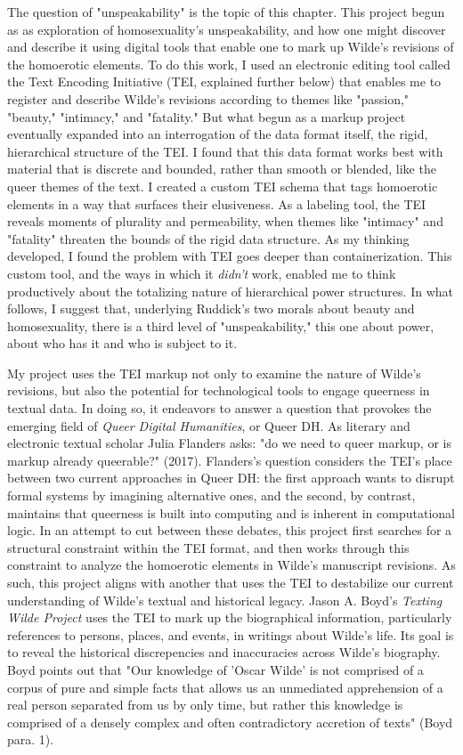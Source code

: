 \documentclass[11pt]{article}
\begin{document}
The question of "unspeakability" is the topic of this chapter. This
project begun as as exploration of homosexuality's unspeakability, and
how one might discover and describe it using digital tools that enable
one to mark up Wilde's revisions of the homoerotic elements. To do
this work, I used an electronic editing tool called the Text Encoding
Initiative (TEI, explained further below) that enables me to register
and describe Wilde's revisions according to themes like "passion,"
"beauty," "intimacy," and "fatality." But what begun as a markup
project eventually expanded into an interrogation of the data format
itself, the rigid, hierarchical structure of the TEI. I found that
this data format works best with material that is discrete and
bounded, rather than smooth or blended, like the queer themes of the
text. I created a custom TEI schema that tags homoerotic elements in a
way that surfaces their elusiveness. As a labeling tool, the TEI
reveals moments of plurality and permeability, when themes like
"intimacy" and "fatality" threaten the bounds of the rigid data
structure. As my thinking developed, I found the problem with TEI goes
deeper than containerization. This custom tool, and the ways in which
it \emph{didn't} work, enabled me to think productively about the
totalizing nature of hierarchical power structures. In what follows, I
suggest that, underlying Ruddick's two morals about beauty and
homosexuality, there is a third level of "unspeakability," this one
about power, about who has it and who is subject to it.

My project uses the TEI markup not only to examine the nature of
Wilde's revisions, but also the potential for technological tools to
engage queerness in textual data. In doing so, it endeavors to answer
a question that provokes the emerging field of \emph{Queer Digital
Humanities}, or Queer DH. As literary and electronic textual scholar
Julia Flanders asks: "do we need to queer markup, or is markup already
queerable?" (2017). Flanders's question considers the TEI's place
between two current approaches in Queer DH: the first approach wants
to disrupt formal systems by imagining alternative ones, and the
second, by contrast, maintains that queerness is built into computing
and is inherent in computational logic. In an attempt to cut between
these debates, this project first searches for a structural constraint
within the TEI format, and then works through this constraint to
analyze the homoerotic elements in Wilde's manuscript revisions. As
such, this project aligns with another that uses the TEI to
destabilize our current understanding of Wilde's textual and
historical legacy. Jason A. Boyd's \emph{Texting Wilde Project} uses the
TEI to mark up the biographical information, particularly references
to persons, places, and events, in writings about Wilde's life. Its
goal is to reveal the historical discrepencies and inaccuracies across
Wilde's biography. Boyd points out that "Our knowledge of 'Oscar
Wilde' is not comprised of a corpus of pure and simple facts that
allows us an unmediated apprehension of a real person separated from
us by only time, but rather this knowledge is comprised of a densely
complex and often contradictory accretion of texts" (Boyd para. 1).
\end{document}
